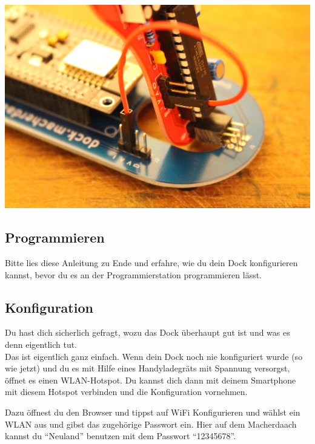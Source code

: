\documentclass{article}
\begin{document}
\vspace{1cm}

\begin{minipage}[b]{0.5\textwidth}
	\includegraphics[width=\textwidth]{Bilder2019/IMG_6490.JPG}
\end{minipage}

\subsection{Programmieren}

Bitte lies diese Anleitung zu Ende und erfahre, wie du dein Dock konfigurieren kannst, bevor du es an der Programmierstation programmieren lässt.

\subsection{Konfiguration}

Du hast dich sicherlich gefragt, wozu das Dock überhaupt gut ist und was es denn eigentlich tut.\\

Das ist eigentlich ganz einfach. Wenn dein Dock noch nie konfiguriert wurde (so wie jetzt) und du es mit Hilfe eines Handyladegräts mit Spannung versorgst, öffnet es einen WLAN-Hotspot. Du kannst dich dann mit deinem Smartphone mit diesem Hotspot verbinden und die Konfiguration vornehmen.

Dazu öffnest du den Browser und tippst auf WiFi Konfigurieren und wählst ein WLAN aus und gibst das zugehörige Passwort ein.
Hier auf dem Macherdaach kannst du "`Neuland"' benutzen mit dem Passwort "`12345678"'.
\end{document}

